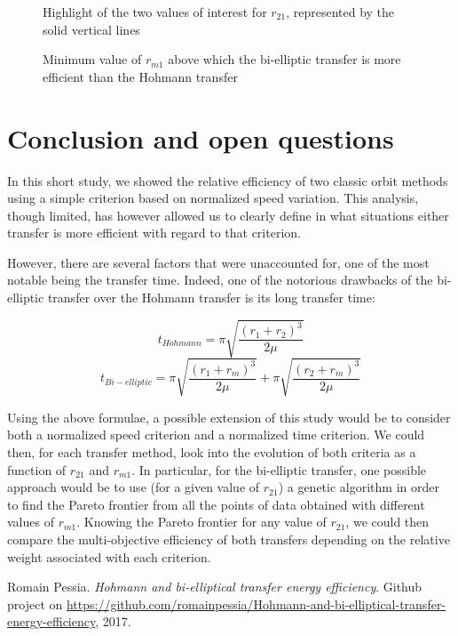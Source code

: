 \documentclass[journal]{IEEEtran}
\begin{document}
\begin{figure}[htp!]
  \centering
  
  \caption{Highlight of the two values of interest for $r_{21}$, represented by the solid vertical lines}
  \label{plot:vbar2}
\end{figure}

\begin{figure}[htp!]
  \centering
  
  \caption{Minimum value of $r_{m1}$ above which the bi-elliptic transfer is more efficient than the Hohmann transfer}
  \label{plot:vbar3}
\end{figure}

\section*{Conclusion and open questions}

In this short study, we showed the relative efficiency of two classic orbit methods using a simple criterion based on normalized speed variation. This analysis, though limited, has however allowed us to clearly define in what situations either transfer is more efficient with regard to that criterion.

However, there are several factors that were unaccounted for, one of the most notable being the transfer time. Indeed, one of the notorious drawbacks of the bi-elliptic transfer over the Hohmann transfer is its long transfer time:

\begin{equation}
    t_{Hohmann}=\pi \sqrt{\frac{(r_1+r_2)^3}{2\mu}}
\end{equation}
\begin{equation}
    t_{Bi-elliptic} = \pi \sqrt{\frac{(r_1+r_m)^3}{2\mu}} + \pi \sqrt{\frac{(r_2+r_m)^3}{2 \mu}}
\end{equation}

Using the above formulae, a possible extension of this study would be to consider both a normalized speed criterion and a normalized time criterion. We could then, for each transfer method, look into the evolution of both criteria as a function of  $r_{21}$ and $r_{m1}$. In particular, for the bi-elliptic transfer, one possible approach would be to use (for a given value of $r_{21}$) a genetic algorithm in order to find the Pareto frontier from all the points of data obtained with different values of $r_{m1}$. Knowing the Pareto frontier for any value of $r_{21}$, we could then compare the multi-objective efficiency of both transfers depending on the relative weight associated with each criterion.

\appendices

\begin{thebibliography}{9}
Romain Pessia. 
\textit{Hohmann and bi-elliptical transfer energy efficiency}. 
Github project on \href{https://github.com/romainpessia/Hohmann-and-bi-elliptical-transfer-energy-efficiency}{https://github.com/romainpessia/Hohmann-and-bi-elliptical-transfer-energy-efficiency}, 2017.
\end{thebibliography}
\end{document}
